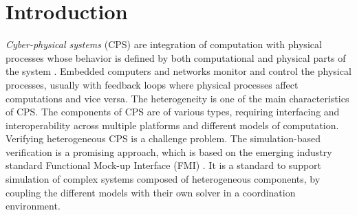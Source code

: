 \section{Introduction}

\textit{Cyber-physical systems} (CPS) are integration of computation with physical processes whose behavior is defined by both computational and physical parts of the system \cite{Zanero17}. Embedded computers and networks monitor and control the physical processes, usually with feedback loops where physical processes affect computations and vice versa. The heterogeneity is one of the main characteristics of CPS. The components of CPS are of various types, requiring interfacing and interoperability across multiple platforms and different models of computation. Verifying heterogeneous CPS is a challenge problem. The simulation-based verification is a promising approach, which is based on the emerging industry standard Functional Mock-up Interface (FMI) \cite{Blochwitz2011The}\cite{BromanBGLMTW13}. It is a standard to support simulation of complex systems composed of heterogeneous components, by coupling the different models with their own solver in a coordination environment.

